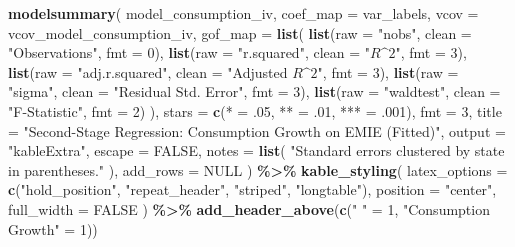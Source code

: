 \documentclass[
]{article}
\newenvironment{Shaded}{\begin{snugshade}}{\end{snugshade}}
\newcommand{\AttributeTok}[1]{\textcolor[rgb]{0.13,0.29,0.53}{#1}}
\newcommand{\ConstantTok}[1]{\textcolor[rgb]{0.56,0.35,0.01}{#1}}
\newcommand{\DecValTok}[1]{\textcolor[rgb]{0.00,0.00,0.81}{#1}}
\newcommand{\FunctionTok}[1]{\textcolor[rgb]{0.13,0.29,0.53}{\textbf{#1}}}
\newcommand{\NormalTok}[1]{#1}
\newcommand{\OtherTok}[1]{\textcolor[rgb]{0.56,0.35,0.01}{#1}}
\newcommand{\SpecialCharTok}[1]{\textcolor[rgb]{0.81,0.36,0.00}{\textbf{#1}}}
\newcommand{\StringTok}[1]{\textcolor[rgb]{0.31,0.60,0.02}{#1}}
\begin{document}
\begin{Shaded}
\begin{Highlighting}[]
\FunctionTok{modelsummary}\NormalTok{(}
\NormalTok{  model\_consumption\_iv,}
  \AttributeTok{coef\_map =}\NormalTok{ var\_labels,}
  \AttributeTok{vcov =}\NormalTok{ vcov\_model\_consumption\_iv,}
  \AttributeTok{gof\_map =} \FunctionTok{list}\NormalTok{(}
    \FunctionTok{list}\NormalTok{(}\AttributeTok{raw =} \StringTok{"nobs"}\NormalTok{, }\AttributeTok{clean =} \StringTok{"Observations"}\NormalTok{, }\AttributeTok{fmt =} \DecValTok{0}\NormalTok{),}
    \FunctionTok{list}\NormalTok{(}\AttributeTok{raw =} \StringTok{"r.squared"}\NormalTok{, }\AttributeTok{clean =} \StringTok{"$R\^{}2$"}\NormalTok{, }\AttributeTok{fmt =} \DecValTok{3}\NormalTok{),}
    \FunctionTok{list}\NormalTok{(}\AttributeTok{raw =} \StringTok{"adj.r.squared"}\NormalTok{, }\AttributeTok{clean =} \StringTok{"Adjusted $R\^{}2$"}\NormalTok{, }\AttributeTok{fmt =} \DecValTok{3}\NormalTok{),}
    \FunctionTok{list}\NormalTok{(}\AttributeTok{raw =} \StringTok{"sigma"}\NormalTok{, }\AttributeTok{clean =} \StringTok{"Residual Std. Error"}\NormalTok{, }\AttributeTok{fmt =} \DecValTok{3}\NormalTok{),}
    \FunctionTok{list}\NormalTok{(}\AttributeTok{raw =} \StringTok{"waldtest"}\NormalTok{, }\AttributeTok{clean =} \StringTok{"F{-}Statistic"}\NormalTok{, }\AttributeTok{fmt =} \DecValTok{2}\NormalTok{)}
\NormalTok{  ),}
  \AttributeTok{stars =} \FunctionTok{c}\NormalTok{(}\StringTok{\textquotesingle{}*\textquotesingle{}} \OtherTok{=}\NormalTok{ .}\DecValTok{05}\NormalTok{, }\StringTok{\textquotesingle{}**\textquotesingle{}} \OtherTok{=}\NormalTok{ .}\DecValTok{01}\NormalTok{, }\StringTok{\textquotesingle{}***\textquotesingle{}} \OtherTok{=}\NormalTok{ .}\DecValTok{001}\NormalTok{),}
  \AttributeTok{fmt =} \DecValTok{3}\NormalTok{,}
  \AttributeTok{title =} \StringTok{"Second{-}Stage Regression: Consumption Growth on EMIE (Fitted)"}\NormalTok{,}
  \AttributeTok{output =} \StringTok{"kableExtra"}\NormalTok{,}
  \AttributeTok{escape =} \ConstantTok{FALSE}\NormalTok{,}
  \AttributeTok{notes =} \FunctionTok{list}\NormalTok{(}
    \StringTok{"Standard errors clustered by state in parentheses."}
\NormalTok{  ),}
  \AttributeTok{add\_rows =} \ConstantTok{NULL}
\NormalTok{) }\SpecialCharTok{\%\textgreater{}\%}
  \FunctionTok{kable\_styling}\NormalTok{(}
    \AttributeTok{latex\_options =} \FunctionTok{c}\NormalTok{(}\StringTok{"hold\_position"}\NormalTok{, }\StringTok{"repeat\_header"}\NormalTok{, }\StringTok{"striped"}\NormalTok{, }\StringTok{"longtable"}\NormalTok{),}
    \AttributeTok{position =} \StringTok{"center"}\NormalTok{,}
    \AttributeTok{full\_width =} \ConstantTok{FALSE}
\NormalTok{  ) }\SpecialCharTok{\%\textgreater{}\%}
  \FunctionTok{add\_header\_above}\NormalTok{(}\FunctionTok{c}\NormalTok{(}\StringTok{" "} \OtherTok{=} \DecValTok{1}\NormalTok{, }\StringTok{"Consumption Growth"} \OtherTok{=} \DecValTok{1}\NormalTok{))}
\end{Highlighting}
\end{Shaded}
\end{document}
